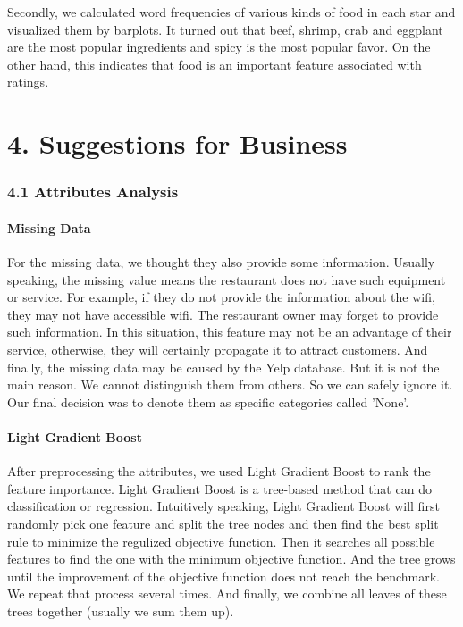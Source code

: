 \documentclass[11pt]{article}
\begin{document}
Secondly, we calculated word frequencies of various kinds of food in
each star and visualized them by barplots. It turned out that beef,
shrimp, crab and eggplant are the most popular ingredients and spicy is
the most popular favor. On the other hand, this indicates that food is
an important feature associated with ratings.

    \section{4. Suggestions for Business}\label{suggestions-for-business}

    \subsubsection{4.1 Attributes Analysis}\label{attributes-analysis}

    \paragraph{Missing Data}\label{missing-data}

    For the missing data, we thought they also provide some information.
Usually speaking, the missing value means the restaurant does not have
such equipment or service. For example, if they do not provide the
information about the wifi, they may not have accessible wifi. The
restaurant owner may forget to provide such information. In this
situation, this feature may not be an advantage of their service,
otherwise, they will certainly propagate it to attract customers. And
finally, the missing data may be caused by the Yelp database. But it is
not the main reason. We cannot distinguish them from others. So we can
safely ignore it. Our final decision was to denote them as specific
categories called 'None'.

    \paragraph{Light Gradient Boost}\label{light-gradient-boost}

    After preprocessing the attributes, we used Light Gradient Boost to rank
the feature importance. Light Gradient Boost is a tree-based method that
can do classification or regression. Intuitively speaking, Light
Gradient Boost will first randomly pick one feature and split the tree
nodes and then find the best split rule to minimize the regulized
objective function. Then it searches all possible features to find the
one with the minimum objective function. And the tree grows until the
improvement of the objective function does not reach the benchmark. We
repeat that process several times. And finally, we combine all leaves of
these trees together (usually we sum them up).
\end{document}
